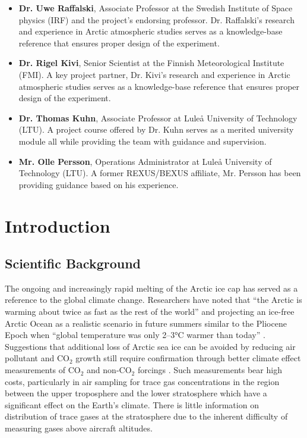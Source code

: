 \documentclass[a4paper,12pt,twoside]{article}
\begin{document}
\begin{itemize}
  \item \textbf{Dr. Uwe Raffalski}, Associate Professor at the Swedish Institute of Space physics (IRF) and the project's endorsing professor. Dr. Raffalski's research and experience in Arctic atmospheric studies serves as a knowledge-base reference that ensures proper design of the experiment.
  \item \textbf{Dr. Rigel Kivi}, Senior Scientist at the Finnish Meteorological Institute (FMI). A key project partner, Dr. Kivi's research and experience in Arctic atmospheric studies serves as a knowledge-base reference that ensures proper design of the experiment.  
  \item \textbf{Dr. Thomas Kuhn}, Associate Professor at Luleå  University of Technology (LTU). A project course offered by Dr. Kuhn serves as a merited university module all while providing the team with guidance and supervision. 
  \item \textbf{Mr. Olle Persson}, Operations Administrator at Luleå University of Technology (LTU). A former REXUS/BEXUS affiliate, Mr. Persson has been providing guidance based on his experience.
\end{itemize}


\pagestyle{SED}
\raggedbottom  %

%

\section{Introduction}
\subsection{Scientific Background}

The ongoing and increasingly rapid melting of the Arctic ice cap has served as a reference to the global climate change. Researchers have noted that \enquote{the Arctic is warming about twice as fast as the rest of the world} \cite{Perkins} and projecting an ice-free Arctic Ocean as a realistic scenario in future summers similar to the Pliocene Epoch when \enquote{global temperature was only 2–3°C warmer than today} \cite{Trace}. Suggestions that additional loss of Arctic sea ice can be avoided by reducing air pollutant and CO$_{2}$ growth still require confirmation through better climate effect measurements of CO$_{2}$ and non-CO$_{2}$ forcings \cite{Trace}. Such measurements bear high costs, particularly in air sampling for trace gas concentrations in the region between the upper troposphere and the lower stratosphere which have a significant effect on the Earth's climate. There is little information on distribution of trace gases at the stratosphere due to the inherent difficulty of measuring gases above aircraft altitudes.
\end{document}

